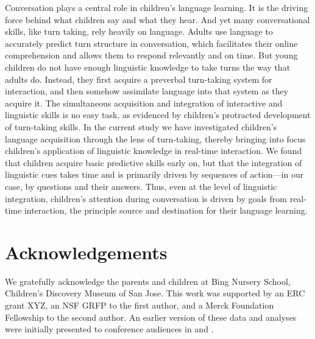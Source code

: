 \documentclass[authoryear, 12pt]{elsarticle}
\begin{document}
Conversation plays a central role in children's language learning. It is the driving force behind what children say and what they hear. And yet many conversational skills, like turn taking, rely heavily on language. Adults use language to accurately predict turn structure in conversation, which facilitates their online comprehension and allows them to respond relevantly and on time. But young children do not have enough linguistic knowledge to take turns the way that adults do. Instead, they first acquire a preverbal turn-taking system for interaction, and then somehow assimilate language into that system as they acquire it. The simultaneous acquisition and integration of interactive and linguistic skills is no easy task, as evidenced by children's protracted development of turn-taking skills. In the current study we have investigated children's language acquisition through the lens of turn-taking, thereby bringing into focus children's application of linguistic knowledge in real-time interaction. We found that children acquire basic predictive skills early on, but that the integration of linguistic cues takes time and is primarily driven by sequences of action---in our case, by questions and their answers. Thus, even at the level of linguistic integration, children's attention during conversation is driven by goals from real-time interaction, the principle source and destination for their language learning.

\section*{Acknowledgements}

We gratefully acknowledge the parents and children at Bing Nursery School, Children's Discovery Museum of San Jose. This work was supported by an ERC grant XYZ, an NSF GRFP to the first author, and a Merck Foundation Fellowship to the second author. An earlier version of these data and analyses were initially presented to conference audiences in \cite{casillas2012} and \cite{casillas2013}.



\end{document}

